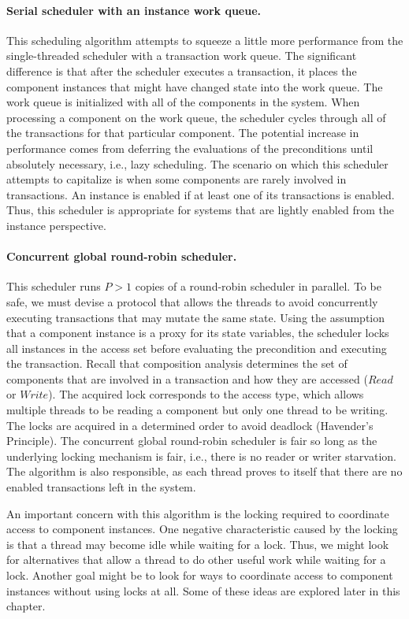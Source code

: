 \paragraph{Serial scheduler with an instance work queue.}
This scheduling algorithm attempts to squeeze a little more performance from the single-threaded scheduler with a transaction work queue.
The significant difference is that after the scheduler executes a transaction, it places the component instances that might have changed state into the work queue.
The work queue is initialized with all of the components in the system.
When processing a component on the work queue, the scheduler cycles through all of the transactions for that particular component.
The potential increase in performance comes from deferring the evaluations of the preconditions until absolutely necessary, i.e., lazy scheduling.
The scenario on which this scheduler attempts to capitalize is when some components are rarely involved in transactions.
An instance is enabled if at least one of its transactions is enabled.
Thus, this scheduler is appropriate for systems that are lightly enabled from the instance perspective.

\paragraph{Concurrent global round-robin scheduler.}
This scheduler runs $P > 1$ copies of a round-robin scheduler in parallel.
To be safe, we must devise a protocol that allows the threads to avoid concurrently executing transactions that may mutate the same state.
Using the assumption that a component instance is a proxy for its state variables, the scheduler locks all instances in the access set before evaluating the precondition and executing the transaction.
Recall that composition analysis determines the set of components that are involved in a transaction and how they are accessed ($\mathit{Read}$ or $\mathit{Write}$).
The acquired lock corresponds to the access type, which allows multiple threads to be reading a component but only one thread to be writing.
The locks are acquired in a determined order to avoid deadlock (Havender's Principle).
The concurrent global round-robin scheduler is fair so long as the underlying locking mechanism is fair, i.e., there is no reader or writer starvation.
The algorithm is also responsible, as each thread proves to itself that there are no enabled transactions left in the system.

An important concern with this algorithm is the locking required to coordinate access to component instances.
One negative characteristic caused by the locking is that a thread may become idle while waiting for a lock.
Thus, we might look for alternatives that allow a thread to do other useful work while waiting for a lock.
Another goal might be to look for ways to coordinate access to component instances without using locks at all.
Some of these ideas are explored later in this chapter.

